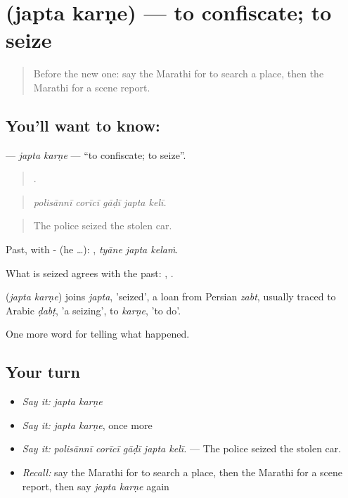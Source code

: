 \section[\texorpdfstring{\mr{जप्त} \mr{करणे} (japta karṇe)}{जप्त करणे (japta karṇe)}]{  (japta karṇe) — to confiscate; to seize}

\label{lesson:MR-C299-japta-karne}



\begin{quote}
Before the new one: say the Marathi for to search a place, then the Marathi for a scene report.
\end{quote}

\subsection*{You'll want to know:  }
\textbf{ } — \emph{japta karṇe} — \textquotedblleft{}to confiscate; to seize\textquotedblright{}.

\begin{quote}
    .
\end{quote}

\begin{quote}
\emph{polisānnī corīcī gāḍī japta kelī.}
\end{quote}

\begin{quote}
The police seized the stolen car.
\end{quote}

Past, with - (he …):   , \emph{tyāne japta kelaṁ}.

What is seized agrees with the past:   ,   .

\begin{cousinweb}
\textbf{ } (\emph{japta karṇe}) joins \emph{japta}, 'seized', a loan from Persian \emph{zabt}, usually traced to Arabic \emph{ḍabṭ}, 'a seizing', to \emph{karṇe}, 'to do'.
\end{cousinweb}

\begin{grammarlens}[title={What you've built}]
One more word for telling what happened.
\end{grammarlens}

\subsection*{Your turn}
\begin{itemize}
\raggedright
  \item \emph{Say it:} \emph{japta karṇe}
  \item \emph{Say it:} \emph{japta karṇe}, once more
  \item \emph{Say it:} \emph{polisānnī corīcī gāḍī japta kelī.} — The police seized the stolen car.
  \item \emph{Recall:} say the Marathi for to search a place, then the Marathi for a scene report, then say \emph{japta karṇe} again
\end{itemize}

